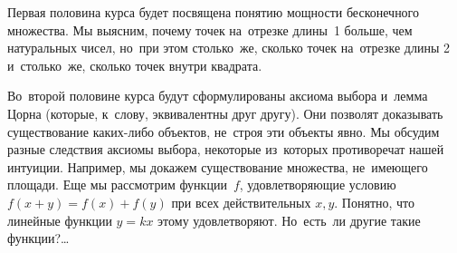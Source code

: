 



Первая половина курса будет посвящена понятию мощности бесконечного множества.
Мы выясним, почему точек на~отрезке длины~1 больше, чем натуральных чисел,
но~при этом столько~же, сколько точек на~отрезке длины 2 и~столько~же, сколько
точек внутри квадрата.

Во~второй половине курса будут сформулированы аксиома выбора и~лемма Цорна
(которые, к~слову, эквивалентны друг другу).
Они позволят доказывать существование каких-либо объектов, не~строя эти объекты
явно.
Мы обсудим разные следствия аксиомы выбора, некоторые из~которых противоречат
нашей интуиции.
Например, мы докажем существование множества, не~имеющего площади.
Еще мы рассмотрим функции~$f$, удовлетворяющие условию $f(x + y) = f(x) + f(y)$
при всех действительных $x, y$.
Понятно, что линейные функции $y = k x$ этому удовлетворяют.
Но~есть~ли другие такие функции?\ldots

